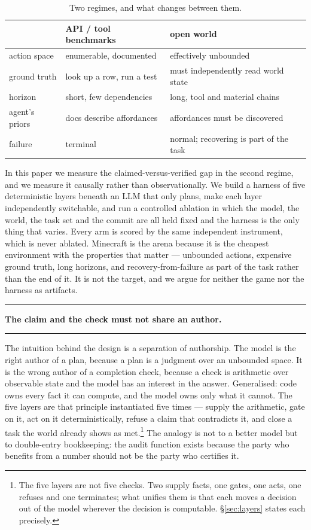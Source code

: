 \documentclass[11pt]{article}
\newenvironment{callout}[1]
  {\par\medskip\noindent\rule{\linewidth}{0.9pt}\par\nobreak\smallskip
   \noindent{\footnotesize\textsc{#1}}\par\nobreak\smallskip\small}
  {\par\smallskip\noindent\rule{\linewidth}{0.4pt}\par\medskip}
\begin{document}
\begin{table}[t]
\centering\small
\begin{tabular}{@{}lll@{}}
\toprule
 & API / tool benchmarks & open world\\
\midrule
action space   & enumerable, documented    & effectively unbounded\\
ground truth   & look up a row, run a test & must independently read world state\\
horizon        & short, few dependencies   & long, tool and material chains\\
agent's priors & docs describe affordances & affordances must be discovered\\
failure        & terminal                  & normal; recovering is part of the task\\
\bottomrule
\end{tabular}
\caption{Two regimes, and what changes between them.}
\label{tab:regimes}
\end{table}

In this paper we measure the claimed-versus-verified gap in the second
regime, and we measure it causally rather than observationally. We build
a harness of five deterministic layers beneath an LLM that only plans,
make each layer independently switchable, and run a controlled ablation
in which the model, the world, the task set and the commit are all held
fixed and the harness is the only thing that varies. Every arm is scored
by the same independent instrument, which is never ablated. Minecraft is
the arena because it is the cheapest environment with the properties
that matter --- unbounded actions, expensive ground truth, long
horizons, and recovery-from-failure as part of the task rather than the
end of it. It is not the target, and we argue for neither the game nor
the harness as artifacts.

\begin{callout}{The design principle}
\centering\normalsize\upshape
\textbf{The claim and the check must not share an author.}
\end{callout}

The intuition behind the design is a separation of authorship. The model
is the right author of a plan, because a plan is a judgment over an
unbounded space. It is the wrong author of a completion check, because a
check is arithmetic over observable state and the model has an interest
in the answer. Generalised: code owns every fact it can compute, and the
model owns only what it cannot. The five layers are that principle
instantiated five times --- supply the arithmetic, gate on it, act on it
deterministically, refuse a claim that contradicts it, and close a task
the world already shows as met.\footnote{The five layers are not five
checks. Two supply facts, one gates, one acts, one refuses and one
terminates; what unifies them is that each moves a decision out of the
model wherever the decision is computable.
\S\ref{sec:layers} states each precisely.} The analogy is not to a
better model but to double-entry bookkeeping: the audit function exists
because the party who benefits from a number should not be the party who
certifies it.
\end{document}
